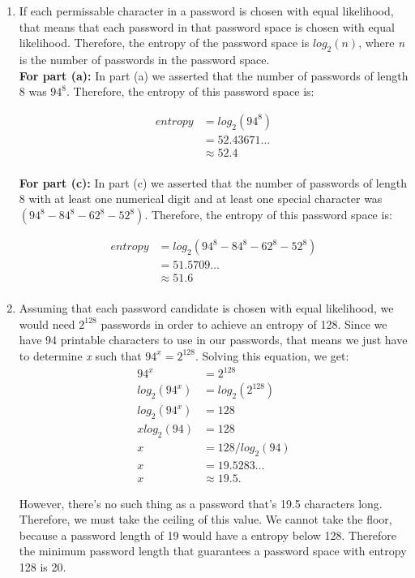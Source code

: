 \documentclass[11pt]{article}
\theoremstyle{definition}
\begin{document}
\begin{enumerate}
\begin{enumerate}
\item If each permissable character in a password is chosen with equal likelihood, that means that each password in that password space is chosen with equal likelihood. Therefore,
the entropy of the password space is $log_2(n)$, where \textit{n} is the number of passwords in the password space.\\

\textbf{For part (a):} In part (a) we asserted that the number of passwords of length 8 was $94^8$. Therefore, the entropy of this password space is:

\begin{align*}
entropy &= log_2(94^8)\\
&= 52.43671\ldots \\
&\approx 52.4\\
\end{align*}

\textbf{For part (c):} In part (c) we asserted that the number of passwords of length 8 with at least one numerical digit and at least one special character was $(94^8 - 84^8 - 62^8 - 52^8)$.
Therefore, the entropy of this password space is:

\begin{align*}
entropy &= log_2(94^8 - 84^8 - 62^8 - 52^8)\\
&= 51.5709\ldots \\
&\approx 51.6\\
\end{align*}

\item Assuming that each password candidate is chosen with equal likelihood, we would need $2^{128}$ passwords in order to achieve an entropy of 128. Since we have 94 printable
characters to use in our passwords, that means we just have to determine \textit{x} such that $94^x = 2^{128}$. Solving this equation, we get:\\

\begin{align*}
94^x &= 2^{128}\\
log_2(94^x) &= log_2(2^{128})\\
log_2(94^x) &= 128\\
x log_2(94) &= 128\\
x &= 128 / log_2(94)\\
x &=  19.5283 \ldots \\
x&\approx 19.5.
\end{align*}

However, there's no such thing as a password that's 19.5 characters long. Therefore, we must take the ceiling of this value. We cannot take the floor, because a password length
of 19 would have a entropy below 128. Therefore the minimum password length that guarantees a password space with entropy 128 is 20.


\end{enumerate}
\end{enumerate}
\end{document}
